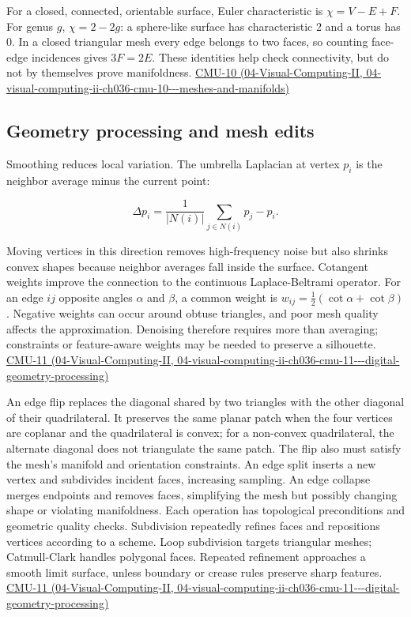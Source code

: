 For a closed, connected, orientable surface, Euler characteristic is \(\chi=V-E+F\). For genus \(g\), \(\chi=2-2g\): a sphere-like surface has characteristic 2 and a torus has 0. In a closed triangular mesh every edge belongs to two faces, so counting face-edge incidences gives \(3F=2E\). These identities help check connectivity, but do not by themselves prove manifoldness. \href{../04-Visual-Computing-II/main.pdf\#nameddest=04-visual-computing-ii-ch036-cmu-10---meshes-and-manifolds}{CMU-10 (04-Visual-Computing-II, 04-visual-computing-ii-ch036-cmu-10-\/-\/-meshes-and-manifolds)}

\subsection{Geometry processing and mesh edits}\label{03-visual-computing-i-ch002-geometry-processing-and-mesh-edits}

Smoothing reduces local variation. The umbrella Laplacian at vertex \(p_i\) is the neighbor average minus the current point:

\[
\Delta p_i=\frac1{|N(i)|}\sum_{j\in N(i)}p_j-p_i.
\]

Moving vertices in this direction removes high-frequency noise but also shrinks convex shapes because neighbor averages fall inside the surface. Cotangent weights improve the connection to the continuous Laplace-Beltrami operator. For an edge \(ij\) opposite angles \(\alpha\) and \(\beta\), a common weight is \(w_{ij}=\tfrac12(\cot\alpha+\cot\beta)\). Negative weights can occur around obtuse triangles, and poor mesh quality affects the approximation. Denoising therefore requires more than averaging; constraints or feature-aware weights may be needed to preserve a silhouette. \href{../04-Visual-Computing-II/main.pdf\#nameddest=04-visual-computing-ii-ch036-cmu-11---digital-geometry-processing}{CMU-11 (04-Visual-Computing-II, 04-visual-computing-ii-ch036-cmu-11-\/-\/-digital-geometry-processing)}

An edge flip replaces the diagonal shared by two triangles with the other diagonal of their quadrilateral. It preserves the same planar patch when the four vertices are coplanar and the quadrilateral is convex; for a non-convex quadrilateral, the alternate diagonal does not triangulate the same patch. The flip also must satisfy the mesh's manifold and orientation constraints. An edge split inserts a new vertex and subdivides incident faces, increasing sampling. An edge collapse merges endpoints and removes faces, simplifying the mesh but possibly changing shape or violating manifoldness. Each operation has topological preconditions and geometric quality checks. Subdivision repeatedly refines faces and repositions vertices according to a scheme. Loop subdivision targets triangular meshes; Catmull-Clark handles polygonal faces. Repeated refinement approaches a smooth limit surface, unless boundary or crease rules preserve sharp features. \href{../04-Visual-Computing-II/main.pdf\#nameddest=04-visual-computing-ii-ch036-cmu-11---digital-geometry-processing}{CMU-11 (04-Visual-Computing-II, 04-visual-computing-ii-ch036-cmu-11-\/-\/-digital-geometry-processing)}

